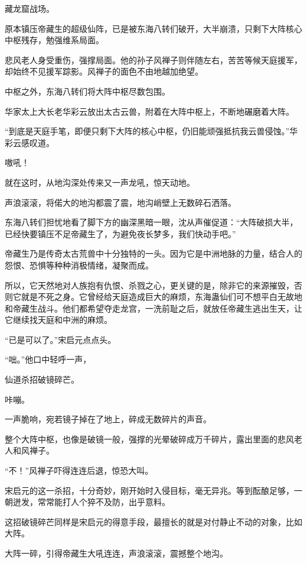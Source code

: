 
\begin{this_body}

藏龙窟战场。

原本镇压帝藏生的超级仙阵，已是被东海八转们破开，大半崩溃，只剩下大阵核心中枢残存，勉强维系局面。

悲风老人身受重伤，强撑局面。他的孙子风禅子则伴随左右，苦苦等候天庭援军，却始终不见援军踪影。风禅子的面色不由地越加绝望。

中枢之外，东海八转们将大阵中枢尽数包围。

华家太上大长老华彩云放出太古云兽，附着在大阵中枢上，不断地碾磨着大阵。

“到底是天庭手笔，即便只剩下大阵的核心中枢，仍旧能顽强抵抗我云兽侵蚀。”华彩云感叹道。

嗷吼！

就在这时，从地沟深处传来又一声龙吼，惊天动地。

声浪滚滚，将偌大的地沟都震了震，地沟峭壁上无数碎石洒落。

东海八转们担忧地看了脚下方的幽深黑暗一眼，沈从声催促道：“大阵破损大半，已经快要镇压不足帝藏生了，为避免夜长梦多，我们快动手吧。”

帝藏生乃是传奇太古荒兽中十分独特的一头。因为它是中洲地脉的力量，结合人的怨恨、恐惧等种种消极情绪，凝聚而成。

所以，它天然地对人族抱有仇恨、杀戮之心，更关键的是，除非它的来源摧毁，否则它就是不死之身。它曾经给天庭造成巨大的麻烦，东海蛊仙们可不想平白无故地和帝藏生战斗。他们都希望夺走龙宫，一洗前耻之后，就放任帝藏生逃出生天，让它继续找天庭和中洲的麻烦。

“已是可以了。”宋启元点点头。

“咄。”他口中轻呼一声，

仙道杀招破镜碎芒。

咔嘣。

一声脆响，宛若镜子掉在了地上，碎成无数碎片的声音。

整个大阵中枢，也像是破镜一般，强撑的光晕破碎成万千碎片，露出里面的悲风老人和风禅子。

“不！”风禅子吓得连连后退，惊恐大叫。

宋启元的这一杀招，十分奇妙，刚开始时入侵目标，毫无异兆。等到酝酿足够，一朝迸发，常常能打人个猝不及防，出乎意料。

这招破镜碎芒同样是宋启元的得意手段，最擅长的就是对付静止不动的对象，比如大阵。

大阵一碎，引得帝藏生大吼连连，声浪滚滚，震撼整个地沟。


\end{this_body}
